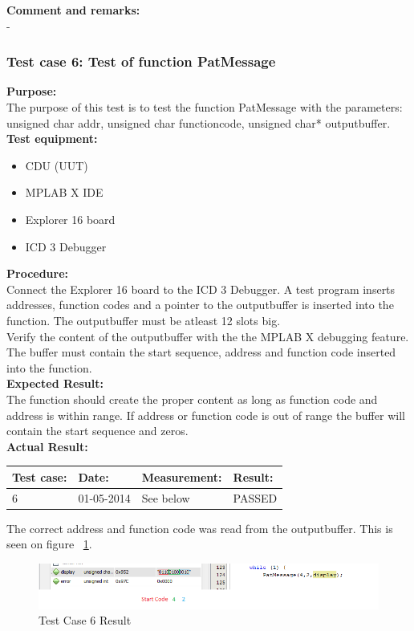\textbf{Comment and remarks:}\\
-\\

\subsubsection{Test case 6: Test of function PatMessage }
\textbf{Purpose:}\\
The purpose of this test is to test the function PatMessage with the parameters: unsigned char addr, unsigned char functioncode, unsigned char* outputbuffer.\\

\textbf{Test equipment:}
\begin{itemize}
\item CDU (UUT)
\item MPLAB X IDE
\item Explorer 16 board
\item ICD 3 Debugger
\end{itemize}

\textbf{Procedure:}\\
Connect the Explorer 16 board to the ICD 3 Debugger. A test program inserts addresses, function codes and a pointer to the outputbuffer is inserted into the function. The outputbuffer must be atleast 12 slots big.\\
Verify the content of the outputbuffer with the the MPLAB X debugging feature. The buffer must contain the start sequence, address and function code inserted into the function.\\

\textbf{Expected Result:}\\
The function should create the proper content as long as function code and address is within range. If address or function code is out of range the buffer will contain the start sequence and zeros.\\

\textbf{Actual Result:}\\
\begin{table}[H]
\centering
\begin{tabular}{|p{2cm}|p{2cm}|p{3cm}|p{2cm}|}\hline
\textbf{Test case:} & \textbf{Date:} & \textbf{Measurement:} & \textbf{Result:} \\ \hline
6 & 01-05-2014 & See below & PASSED \\ \hline
\end{tabular}
\end{table}
The correct address and function code was read from the outputbuffer. This is seen on figure ~\ref{fig:cdutestcase6}.\\
\begin{figure}[H]
\centering
\includegraphics[width=1\textwidth]{billeder/CDUtestcase6}
\caption{Test Case 6 Result}
\label{fig:cdutestcase6}
\end{figure}

